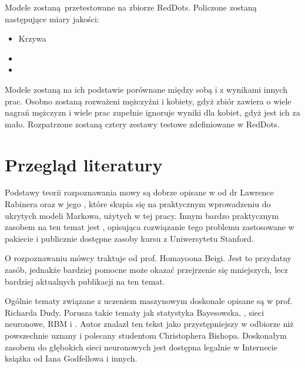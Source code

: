 Modele zostaną przetestowane na zbiorze RedDots. Policzone zostaną następujące miary jakości:

\begin{itemize}
    \item Krzywa 
    \item {}
    \item {}
\end{itemize}

Modele zostaną na ich podstawie porównane między sobą i z wynikami innych prac. Osobno zostaną rozważeni mężczyźni 
i kobiety, gdyż zbiór zawiera o wiele nagrań mężczyzn i wiele prac zupełnie ignoruje wyniki dla kobiet, 
gdyż jest ich za mało. Rozpatrzone zostaną cztery zestawy testowe zdefiniowane w RedDots.

\section{Przegląd literatury}\label{sec:przeglad_literatury}

Podstawy teorii rozpoznawania mowy są dobrze opisane w  
od dr Lawrence Rabinera oraz w jego 
, które
skupia się na praktycznym wprowadzeniu do ukrytych modeli Markowa, użytych w tej pracy.
Innym bardzo praktycznym zasobem na ten temat jest , opisująca rozwiązanie
tego problemu zastosowane w pakiecie  i publicznie dostępne zasoby
kursu  z Uniwersytetu Stanford.

O rozpoznawaniu mówcy traktuje  od prof. Homayoona Beigi.
Jest to przydatny zasób, jednakże bardziej pomocne może okazać przejrzenie się mniejszych, lecz
bardziej aktualnych publikacji na ten temat.

Ogólnie tematy związane z uczeniem maszynowym doskonale opisane są w  prof. Richarda Dudy.
Porusza takie tematy jak statystyka Bayesowska, , sieci neuronowe, RBM 
i . Autor znalazł ten tekst jako przystępniejszy w odbiorze niż powszechnie 
uznany i polecany studentom  Christophera Bishopa. 
Doskonałym zasobem do głębokich sieci neuronowych jest dostępna legalnie w Internecie książka 
\cite{deeplearningbook} od Iana Godfellowa i innych.

